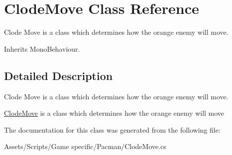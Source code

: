 \hypertarget{class_clode_move}{\section{Clode\-Move Class Reference}
\label{class_clode_move}
}


Clode Move is a class which determines how the orange enemy will move.  




Inherits Mono\-Behaviour.



\subsection{Detailed Description}
Clode Move is a class which determines how the orange enemy will move. 

\hyperlink{class_clode_move}{Clode\-Move} is a class which determines how the orange enemy will move 

The documentation for this class was generated from the following file\-:\begin{DoxyCompactItemize}
\item 
Assets/\-Scripts/\-Game specific/\-Pacman/Clode\-Move.\-cs\end{DoxyCompactItemize}
